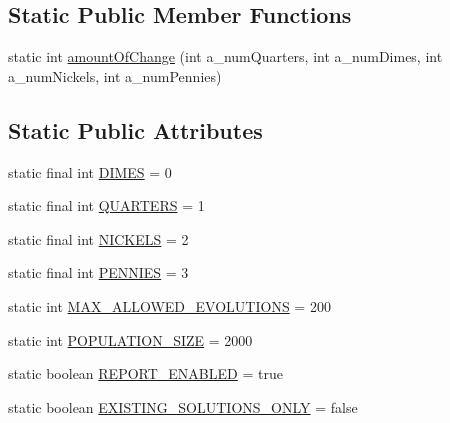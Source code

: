 \subsection*{Static Public Member Functions}
\begin{DoxyCompactItemize}
\item 
static int \hyperlink{classexamples_1_1supergene_1_1_abstract_supergene_test_a634c86555d7accce1bd015ff6f99c630}{amount\-Of\-Change} (int a\-\_\-num\-Quarters, int a\-\_\-num\-Dimes, int a\-\_\-num\-Nickels, int a\-\_\-num\-Pennies)
\end{DoxyCompactItemize}
\subsection*{Static Public Attributes}
\begin{DoxyCompactItemize}
\item 
static final int \hyperlink{classexamples_1_1supergene_1_1_abstract_supergene_test_a2581251d3607aad43d8b2815b8202c8e}{D\-I\-M\-E\-S} = 0
\item 
static final int \hyperlink{classexamples_1_1supergene_1_1_abstract_supergene_test_aed911231f02517c09e71a453e303b655}{Q\-U\-A\-R\-T\-E\-R\-S} = 1
\item 
static final int \hyperlink{classexamples_1_1supergene_1_1_abstract_supergene_test_a816ceb1de4c9bf5c3df3bac9210c380c}{N\-I\-C\-K\-E\-L\-S} = 2
\item 
static final int \hyperlink{classexamples_1_1supergene_1_1_abstract_supergene_test_a0853afd453197d0e7db44388752d12af}{P\-E\-N\-N\-I\-E\-S} = 3
\item 
static int \hyperlink{classexamples_1_1supergene_1_1_abstract_supergene_test_aabc7656a38ca4e7322c3ff08d34ee8f4}{M\-A\-X\-\_\-\-A\-L\-L\-O\-W\-E\-D\-\_\-\-E\-V\-O\-L\-U\-T\-I\-O\-N\-S} = 200
\item 
static int \hyperlink{classexamples_1_1supergene_1_1_abstract_supergene_test_af5010d4eddc24d9723d539ea6c12c595}{P\-O\-P\-U\-L\-A\-T\-I\-O\-N\-\_\-\-S\-I\-Z\-E} = 2000
\item 
static boolean \hyperlink{classexamples_1_1supergene_1_1_abstract_supergene_test_a6884362188d843b7a05c2845e9857358}{R\-E\-P\-O\-R\-T\-\_\-\-E\-N\-A\-B\-L\-E\-D} = true
\item 
static boolean \hyperlink{classexamples_1_1supergene_1_1_abstract_supergene_test_afa2af2b745985502119958481e9c12f6}{E\-X\-I\-S\-T\-I\-N\-G\-\_\-\-S\-O\-L\-U\-T\-I\-O\-N\-S\-\_\-\-O\-N\-L\-Y} = false
\end{DoxyCompactItemize}
